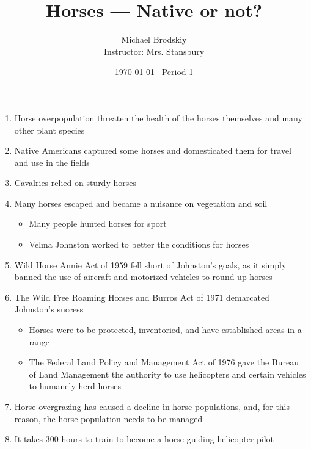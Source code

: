 \documentclass[12pt]{article}
\title{Horses — Native or not?}
\date{\today – Period 1}
\author{Michael Brodskiy\\ \small Instructor: Mrs. Stansbury}
\begin{document}
\maketitle

\begin{enumerate}

  \item Horse overpopulation threaten the health of the horses themselves and many other plant species

  \item Native Americans captured some horses and domesticated them for travel and use in the fields

  \item Cavalries relied on sturdy horses

  \item Many horses escaped and became a nuisance on vegetation and soil

    \begin{itemize}

      \item Many people hunted horses for sport

      \item Velma Johnston worked to better the conditions for horses

    \end{itemize}

  \item Wild Horse Annie Act of 1959 fell short of Johnston's goals, as it simply banned the use of aircraft and motorized vehicles to round up horses

  \item The Wild Free Roaming Horses and Burros Act of 1971 demarcated Johnston's success

    \begin{itemize}

      \item Horses were to be protected, inventoried, and have established areas in a range

      \item The Federal Land Policy and Management Act of 1976 gave the Bureau of Land Management the authority to use helicopters and certain vehicles to humanely herd horses

    \end{itemize}

  \item Horse overgrazing has caused a decline in horse populations, and, for this reason, the horse population needs to be managed

  \item It takes 300 hours to train to become a horse-guiding helicopter pilot

\end{enumerate}
\end{document}

